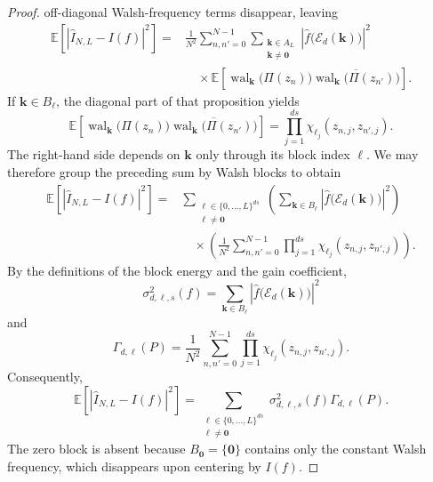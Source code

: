 \documentclass[11pt]{article}
\newcommand{\E}{\mathcal E}
\newcommand{\wal}{\operatorname{wal}}
\begin{document}
\begin{proof}
off-diagonal Walsh-frequency terms disappear, leaving
\[
\begin{aligned}
  \mathbb E\!\left[
    \left|\widehat I_{N,L}-I(f)\right|^2
  \right]
  ={}&\frac1{N^2}\sum_{n,n'=0}^{N-1}
      \sum_{\substack{\boldsymbol k\in A_L\\
                       \boldsymbol k\neq\boldsymbol0}}
      \left|
        \widehat f\bigl(\E_d(\boldsymbol k)\bigr)
      \right|^2 \\
  &\quad\times
      \mathbb E\!\left[
        \wal_{\boldsymbol k}\bigl(\Pi(z_n)\bigr)
        \overline{
          \wal_{\boldsymbol k}\bigl(\Pi(z_{n'})\bigr)
        }
      \right].
\end{aligned}
\]
If \(\boldsymbol k\in B_{\boldsymbol\ell}\), the diagonal part of that
proposition yields
\[
  \mathbb E\!\left[
    \wal_{\boldsymbol k}\bigl(\Pi(z_n)\bigr)
    \overline{
      \wal_{\boldsymbol k}\bigl(\Pi(z_{n'})\bigr)
    }
  \right]
  =\prod_{j=1}^{ds}
     \chi_{\ell_j}(z_{n,j},z_{n',j}).
\]
The right-hand side depends on \(\boldsymbol k\) only through its block
index \(\boldsymbol\ell\).  We may therefore group the preceding sum by
Walsh blocks to obtain
\[
\begin{aligned}
  \mathbb E\!\left[
    \left|\widehat I_{N,L}-I(f)\right|^2
  \right]
  ={}&
  \sum_{\substack{
          \boldsymbol\ell\in\{0,\ldots,L\}^{ds}\\
          \boldsymbol\ell\neq\boldsymbol0}}
  \left(
    \sum_{\boldsymbol k\in B_{\boldsymbol\ell}}
      \left|
        \widehat f\bigl(\E_d(\boldsymbol k)\bigr)
      \right|^2
  \right) \\
  &\quad\times
  \left(
    \frac1{N^2}\sum_{n,n'=0}^{N-1}
      \prod_{j=1}^{ds}
        \chi_{\ell_j}(z_{n,j},z_{n',j})
  \right).
\end{aligned}
\]
By the definitions of the block energy and the gain coefficient,
\[
  \sigma_{d,\boldsymbol\ell,s}^2(f)
  =\sum_{\boldsymbol k\in B_{\boldsymbol\ell}}
     \left|
       \widehat f\bigl(\E_d(\boldsymbol k)\bigr)
     \right|^2
\]
and
\[
  \Gamma_{d,\boldsymbol\ell}(P)
  =\frac1{N^2}\sum_{n,n'=0}^{N-1}
     \prod_{j=1}^{ds}
       \chi_{\ell_j}(z_{n,j},z_{n',j}).
\]
Consequently,
\[
  \mathbb E\!\left[
    \left|\widehat I_{N,L}-I(f)\right|^2
  \right]
  =\sum_{\substack{
       \boldsymbol\ell\in\{0,\ldots,L\}^{ds}\\
       \boldsymbol\ell\neq\boldsymbol0}}
     \sigma_{d,\boldsymbol\ell,s}^2(f)
     \Gamma_{d,\boldsymbol\ell}(P).
\]
The zero block is absent because
\(B_{\boldsymbol0}=\{\boldsymbol0\}\) contains only the constant Walsh
frequency, which disappears upon centering by \(I(f)\).


\end{proof}
\end{document}
